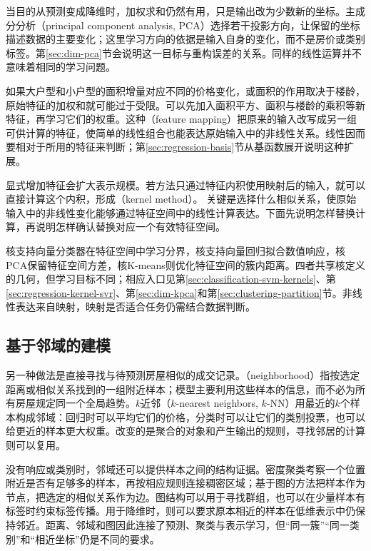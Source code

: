 当目的从预测变成降维时，加权求和仍然有用，只是输出改为少数新的坐标。主成分分析（principal component analysis, PCA）选择若干投影方向，让保留的坐标描述数据的主要变化；这里学习方向的依据是输入自身的变化，而不是房价或类别标签。第\ref{sec:dim-pca}节会说明这一目标与重构误差的关系。同样的线性运算并不意味着相同的学习问题。

如果大户型和小户型的面积增量对应不同的价格变化，或面积的作用取决于楼龄，原始特征的加权和就可能过于受限。可以先加入面积平方、面积与楼龄的乘积等新特征，再学习它们的权重。这种（feature mapping）把原来的输入改写成另一组可供计算的特征，使简单的线性组合也能表达原始输入中的非线性关系。线性因而要相对于所用的特征来判断；第\ref{sec:regression-basis}节从基函数展开说明这种扩展。

显式增加特征会扩大表示规模。若方法只通过特征内积使用映射后的输入，就可以直接计算这个内积，形成（kernel method）。
关键是选择什么相似关系，使原始输入中的非线性变化能够通过特征空间中的线性计算表达。下面先说明怎样替换计算，再说明怎样确认替换对应一个有效特征空间。



核支持向量分类器在特征空间中学习分界，核支持向量回归拟合数值响应，核PCA保留特征空间方差，核K-means则优化特征空间的簇内距离。四者共享核定义的几何，但学习目标不同；相应入口见第\ref{sec:classification-svm-kernels}、第\ref{sec:regression-kernel-svr}、第\ref{sec:dim-kpca}和第\ref{sec:clustering-partition}节。非线性表达来自映射，映射是否适合任务仍需结合数据判断。

\subsection{基于邻域的建模}
\label{sec:classic-overview-neighborhood}

另一种做法是直接寻找与待预测房屋相似的成交记录。（neighborhood）指按选定距离或相似关系找到的一组附近样本；模型主要利用这些样本的信息，而不必为所有房屋规定同一个全局趋势。$k$近邻（$k$-nearest neighbors, $k$-NN）用最近的$k$个样本构成邻域：回归时可以平均它们的价格，分类时可以让它们的类别投票，也可以给更近的样本更大权重。改变的是聚合的对象和产生输出的规则，寻找邻居的计算则可以复用。

没有响应或类别时，邻域还可以提供样本之间的结构证据。密度聚类考察一个位置附近是否有足够多的样本，再按相应规则连接稠密区域；基于图的方法把样本作为节点，把选定的相似关系作为边。图结构可以用于寻找群组，也可以在少量样本有标签时约束标签传播。用于降维时，则可以要求原本相近的样本在低维表示中仍保持邻近。距离、邻域和图因此连接了预测、聚类与表示学习，但“同一簇”“同一类别”和“相近坐标”仍是不同的要求。

